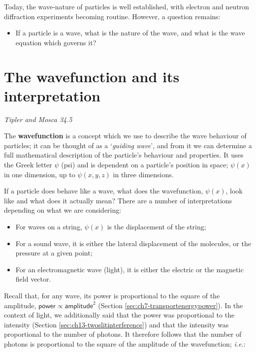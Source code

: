 \documentclass[
]{book}
\providecommand{\tightlist}{%
  \setlength{\itemsep}{0pt}\setlength{\parskip}{0pt}}
\begin{document}
Today, the wave-nature of particles is well established, with electron and neutron diffraction experiments becoming routine. However, a question remains:

\begin{itemize}
\tightlist
\item
  If a particle is a wave, what is the nature of the wave, and what is the wave equation which governs it?
\end{itemize}

\hypertarget{sec:ch17-wavefunction1}{%
\section{The wavefunction and its interpretation}\label{sec:ch17-wavefunction1}}

\emph{Tipler and Mosca 34.5}

The \textbf{wavefunction} is a concept which we use to describe the wave behaviour of particles; it can be thought of as a `\emph{guiding wave}', and from it we can determine a full mathematical description of the particle's behaviour and properties. It uses the Greek letter \(\psi\) (psi) and is dependent on a particle's position in space; \(\psi(x)\) in one dimension, up to \(\psi(x,y,z)\) in three dimensions.

If a particle does behave like a wave, what does the wavefunction, \(\psi(x)\), look like and what does it actually mean? There are a number of interpretations depending on what we are considering:

\begin{itemize}
\tightlist
\item
  For waves on a string, \(\psi(x)\) is the displacement of the string;
\item
  For a sound wave, it is either the lateral displacement of the molecules, or the pressure at a given point;
\item
  For an electromagnetic wave (light), it is either the electric or the magnetic field vector.
\end{itemize}

Recall that, for any wave, its power is proportional to the square of the amplitude, \(\textsf{power} \propto \textsf{amplitude}^2\) (Section \ref{sec:ch7-transportenergypower}). In the context of light, we additionally said that the power was proportional to the intensity (Section \ref{sec:ch13-twoslitinterference}) and that the intensity was proportional to the number of photons. It therefore follows that the number of photons is proportional to the square of the amplitude of the wavefunction; \emph{i.e.}:
\end{document}
